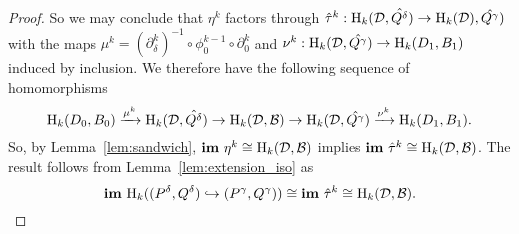 \begin{proof}
  So we may conclude that $\eta^k$ factors through $\hat{\tau}^k : \mathrm{H}_k({\mathcal{D}}, \hat{Q^\delta})\to \mathrm{H}_k({\mathcal{D}}), \hat{Q^\gamma})$ with the maps $\mu^k = (\partial^k_\delta)^{-1}\circ \phi_0^{k-1}\circ\partial_0^k$ and $\nu^k : \mathrm{H}_k({\mathcal{D}}, \hat{Q^\gamma}) \to \mathrm{H}_k(D_1, B_1)$ induced by inclusion.
  We therefore have the following sequence of homomorphisms
  \[ \mathrm{H}_k(D_0, B_0)\xrightarrow{\mu^k} \mathrm{H}_k({\mathcal{D}}, \hat{Q^\delta})\to\mathrm{H}_k({\mathcal{D}}, {\mathcal{B}})\to\mathrm{H}_k({\mathcal{D}}, \hat{Q^\gamma})\xrightarrow{\nu^k} \mathrm{H}_k(D_1, B_1).\]
  So, by Lemma~\ref{lem:sandwich}, $\mathbf{im}~\eta^k\cong \mathrm{H}_k({\mathcal{D}}, {\mathcal{B}})$ implies $\mathbf{im}~\hat{\tau}^k\cong \mathrm{H}_k({\mathcal{D}}, {\mathcal{B}})$.
  The result follows from Lemma~\ref{lem:extension_iso} as
  \[ \mathbf{im}~\mathrm{H}_k((P^\delta, Q^\delta)\hookrightarrow (P^\gamma, Q^\gamma))\cong\mathbf{im}~\hat{\tau}^k\cong \mathrm{H}_k({\mathcal{D}}, {\mathcal{B}}).\]
\end{proof}
